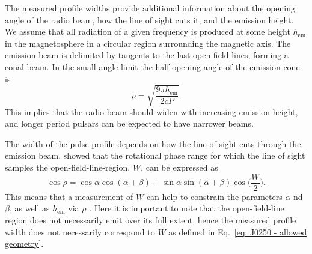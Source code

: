 The measured profile widths provide additional information about the opening angle of the radio beam, how the line of sight cuts it, and the emission height. We assume that all radiation of a given frequency is produced at some height $h_\mathrm{em}$ in the magnetosphere in a circular region surrounding the magnetic axis. The emission beam is delimited by tangents to the last open field lines, forming a conal beam. In the small angle limit \citep[$h_\mathrm{em} \ll R_\mathrm{LC}$, see for example][]{Rxxx1990} the half opening angle of the emission cone is
\begin{equation}
\label{eq: J0250 - cone angle}
    \rho = \sqrt{\frac{9\pi h_\mathrm{em}}{2cP}}.
\end{equation}
This implies that the radio beam should widen with increasing emission height, and longer period pulsars can be expected to have narrower beams.

The width of the pulse profile depends on how the line of sight cuts through the emission beam. \citet{GGRx1984} showed that the rotational phase range for which the line of sight samples the open-field-line-region, $W$, can be expressed as
\begin{equation}
\label{eq: J0250 - allowed geometry}
    \cos\rho = \cos\alpha\cos(\alpha+\beta)+\sin\alpha\sin(\alpha+\beta)\cos\bigg(\frac{W}{2}\bigg).
\end{equation}
This means that a measurement of $W$ can help to constrain the parameters $\alpha$ nd $\beta$, as well as $h_\mathrm{em}$ via $\rho$ \citep[see for example][]{RWJx2015a}. Here it is important to note that the open-field-line region does not necessarily emit over its full extent, hence the measured profile width does not necessarily correspond to $W$ as defined in Eq.~\eqref{eq: J0250 - allowed geometry}.

